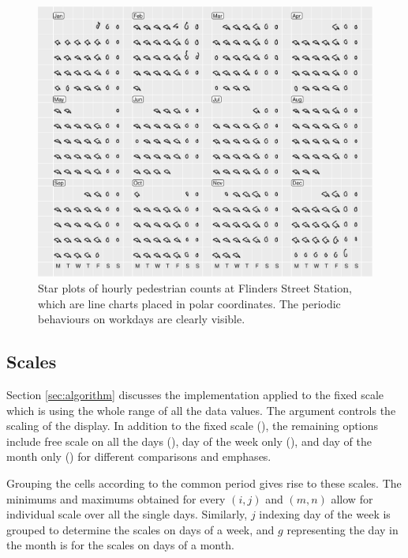 \documentclass[article]{jss}
\begin{document}
\begin{CodeChunk}
\begin{figure}

{\centering \includegraphics[width=\textwidth]{figure/flinders-polar-1} 

}

\caption[Star plots of hourly pedestrian counts at Flinders Street Station, which are line charts placed in polar coordinates]{Star plots of hourly pedestrian counts at Flinders Street Station, which are line charts placed in polar coordinates. The periodic behaviours on workdays are clearly visible.}\label{fig:flinders-polar}
\end{figure}
\end{CodeChunk}

\subsection{Scales}\label{scales}

Section \ref{sec:algorithm} discusses the implementation applied to the
fixed scale which is using the whole range of all the data values. The
 argument controls the scaling of the display. In addition
to the fixed scale (), the remaining options include free
scale on all the days (), day of the week only
(), and day of the month only () for
different comparisons and emphases.

Grouping the cells according to the common period gives rise to these
scales. The minimums and maximums obtained for every \((i, j)\) and
\((m, n)\) allow for individual scale over all the single days.
Similarly, \(j\) indexing day of the week is grouped to determine the
scales on days of a week, and \(g\) representing the day in the month is
for the scales on days of a month.
\end{document}

